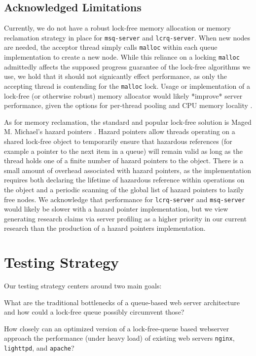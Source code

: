 \documentclass[twoside]{article}
\begin{document}
\begin{multicols}{2}
\subsection{Acknowledged Limitations}

Currently, we do not have a robust lock-free memory allocation or
memory reclamation strategy in place for \verb+msq-server+ and
\verb+lcrq-server+. When new nodes are needed, the acceptor thread
simply calls \verb+malloc+ within each queue implementation to create
a new node. While this reliance on a locking \verb+malloc+ admittedly
affects the supposed progress guarantee of the lock-free algorithms we
use, we hold that it should not signicantly effect performance, as
only the accepting thread is contending for the \verb+malloc+
lock. Usage or implementation of a lock-free (or otherwise robust)
memory allocator would likely *improve* server performance, given the
options for per-thread pooling and CPU memory locality
\cite{hart2007performance}.

As for memory reclamation, the standard and popular lock-free solution
is Maged M. Michael's hazard pointers \cite{michael2004hazard}. Hazard
pointers allow threads operating on a shared lock-free object to
temporarily ensure that hazardous references (for example a pointer to
the next item in a queue) will remain valid as long as the thread
holds one of a finite number of hazard pointers to the object. There
is a small amount of overhead associated with hazard pointers, as the
implementation requires both declaring the lifetime of hazardous
reference within operations on the object and a periodic scanning of
the global list of hazard pointers to lazily free nodes. We
acknowledge that performance for \verb+lcrq-server+ and
\verb+msq-server+ would likely be slower with a hazard pointer
implementation, but we view generating research claims via server
profiling as a higher priority in our current research than the
production of a hazard pointers implementation.

\section{Testing Strategy}

Our testing strategy centers around two main goals:

\begin{compactitem}
\item What are the traditional bottlenecks of a queue-based web server
  architecture and how could a lock-free queue possibly circumvent
  those?
\item How closely can an optimized version of a lock-free-queue based
  webserver approach the performance (under heavy load) of existing
  web servers \verb+nginx+, \verb+lighttpd+, and \verb+apache+?
\end{compactitem}


\end{multicols}
\end{document}
